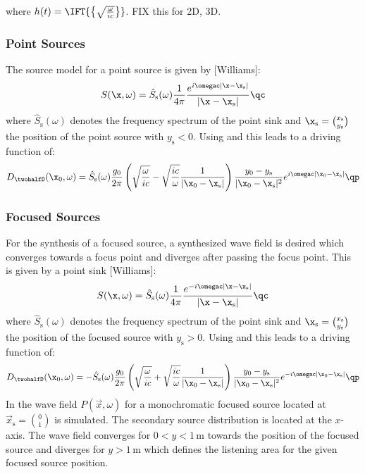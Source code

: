 \documentclass{article}
\begin{document}
where $h(t) = \IFT{\left\{ \sqrt{\frac{\omega}{ic}} \right\}}$. FIX this for 2D, 3D.
\subsubsection{Point Sources}
The source model for a point source is given by [Williams]:
\begin{equation} 
    S(\x,\omega) = 
    \hat{S}_\text{s}(\omega)
    \frac{1}{4\pi} \frac{e^{i\omegac|\x-\x_\text{s}|}}{|\x-\x_\text{s}|}
    \qc 
\end{equation}
where $\hat{S}_\text{s}(\omega)$ denotes the frequency spectrum of the point
sink and $\x_\text{s} = \binom{x_\text{s}}{y_\text{s}}$ the position of the
point source with $y_\text{s} < 0$.
Using  and  this leads to a driving function of:
\begin{equation}
    D_\twohalfD(\x_0,\omega) = \hat{S}_\text{s}(\omega)
    \frac{g_0}{2\pi}
    \left( \sqrt{\frac{\omega}{ic}} - \sqrt{\frac{ic}{\omega}} 
    \frac{1}{|\x_0-\x_\text{s}|} \right)
    \frac{y_0-y_\text{s}}{|\x_0-\x_\text{s}|^{2}} 
    e^{i\omegac|\x_0-\x_\text{s}|}
    \qp
    \label{eq:Dps}
\end{equation}



\subsubsection{Focused Sources}

For the synthesis of a focused source, a synthesized wave field is desired which
converges towards a focus point and diverges after passing the focus point.
This is given by a point sink [Williams]:
\begin{equation} 
    S(\x,\omega) = 
    \hat{S}_\text{s}(\omega)
    \frac{1}{4\pi} \frac{e^{-i\omegac|\x-\x_\text{s}|}}{|\x-\x_\text{s}|}
    \qc 
\end{equation}
where $\hat{S}_\text{s}(\omega)$ denotes the frequency spectrum of the point
sink and $\x_\text{s} = \binom{x_\text{s}}{y_\text{s}}$ the position of the
focused source with $y_\text{s} > 0$.
Using  and  this leads to a driving function of:
\begin{equation}
    D_\twohalfD(\x_0,\omega) = -\hat{S}_\text{s}(\omega)
    \frac{g_0}{2\pi}
    \left( \sqrt{\frac{\omega}{ic}} + \sqrt{\frac{ic}{\omega}} 
    \frac{1}{|\x_0-\x_\text{s}|} \right)
    \frac{y_0-y_\text{s}}{|\x_0-\x_\text{s}|^{2}} 
    e^{-i\omegac|\x_0-\x_\text{s}|}
    \qp
    \label{eq:Dfs}
\end{equation}
In  the wave field $P(\vec{x},\omega)$ for
a monochromatic focused
source located at $\vec{x}_\text{s} = \binom{0}{1}$ is simulated. The secondary
source distribution is located at the $x$-axis. The wave field converges for
$0<y<1$\,m towards the position of the focused source and diverges for $y>1$\,m
which defines the listening area for the given focused source position.
\end{document}
